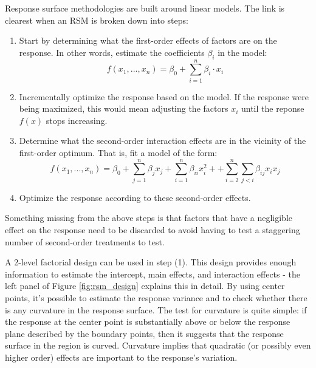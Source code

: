 \documentclass[11pt,a4paper,article]{memoir} %
\begin{document}
Response surface methodologies are built around linear models. The link is clearest when an RSM is broken down into steps:
\begin{enumerate}
\item Start by determining what the first-order effects of factors are on the response. In other words, estimate the coefficients $\beta_i$ in the model:
\begin{equation}
	f(x_1, ..., x_n) = \beta_0 + \sum_{i = 1}^n \beta_i \cdot x_i
\end{equation}
\item Incrementally optimize the response based on the model. If the response were being maximized, this would mean adjusting the factors $x_i$ until the reponse $f(x)$ stops increasing. 
\item Determine what the second-order interaction effects are in the vicinity of the first-order optimum. That is, fit a model of the form:
\begin{equation}
	f(x_1, ..., x_n) = \beta_0 + \sum_{j = 1}^n \beta_{j} x_j + \sum_{i = 1}^n \beta_{ii} x_i^2 + + \sum_{i = 2}^n \sum_{j < i}\beta_{ij} x_i x_j
\end{equation}
\item Optimize the response according to these second-order effects.
\end{enumerate}
Something missing from the above steps is that factors that have a negligible effect on the response need to be discarded to avoid having to test a staggering number of second-order treatments to test.

A 2-level factorial design can be used in step (1). This design provides enough information to estimate the intercept, main effects, and interaction effects - the left panel of Figure \ref{fig:rsm_design} explains this in detail. By using center points, it's possible to estimate the response variance and to check whether there is any curvature in the response surface. The test for curvature is quite simple: if the response at the center point is substantially above or below the response plane described by the boundary points, then it suggests that the response surface in the region is curved. Curvature implies that quadratic (or possibly even higher order) effects are important to the response's variation.
\end{document}
